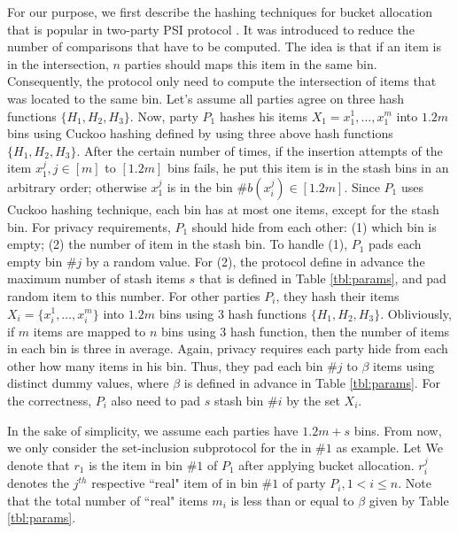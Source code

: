 For our purpose, we first describe the hashing techniques for bucket allocation that is popular in two-party PSI protocol \cite{eurocrypt:FNP04, DBLP:conf/uss/Pinkas0SZ15,DBLP:conf/uss/Pinkas0Z14}. It was introduced to reduce the number of comparisons that have to be computed. The idea is that if an item is in the intersection, $n$ parties should maps this item in the same bin. Consequently, the protocol only need to compute the intersection of items that was located to the same bin. Let's assume all parties agree on three hash functions $\{H_1, H_2, H_3\}$. Now, party $P_1$ hashes his items $X_1={x^1_1, \ldots, x^m_1}$ into $1.2m$ bins using Cuckoo hashing defined by using three above hash functions $\{H_1, H_2, H_3\}$. After the certain number of times, if the insertion attempts of the item $x^j_1, j \in [m]$ to $[1.2m]$ bins  fails,  he put this item is in the stash bins in an arbitrary order; otherwise $x^j_1$ is in the bin \#$b(x^j_i) \in [1.2m]$. Since $P_1$ uses Cuckoo hashing technique, each bin has at most one items, except for the stash bin. For privacy requirements, $P_1$ should hide from each other: (1) which bin is empty; (2) the number of item in the stash bin. To handle (1), $P_1$ pads each empty bin \#$j$ by a random value. For (2), the protocol define in advance the maximum number of stash items $s$ that is defined in Table \ref{tbl:params}, and pad random item to this number.  For other parties $P_i$, they hash their items $X_i=\{x^1_i, \ldots, x^m_i\}$ into $1.2m$ bins using 3 hash functions $\{H_1, H_2, H_3\}$. Obliviously, if $m$ items are mapped to $n$ bins using 3 hash function, then the number of items in each bin is three in average. Again, privacy requires each party hide from each other how many items in his bin. Thus, they pad each bin \#$j$ to $\beta$ items using distinct dummy values, where $\beta$ is defined in advance in Table \ref{tbl:params}. For the correctness, $P_i$ also need to pad $s$ stash bin \#$i$ by the set $X_i$. %




In the sake of simplicity, we assume each parties have $1.2m+s$ bins. From now, we only consider the set-inclusion subprotocol for the in \#$1$ as example. Let  We denote that $r_1$ is the item in bin \#$1$ of $P_1$ after applying bucket allocation. $r^{j}_i $ denotes the $j^{th}$ respective ``real" item of in bin \#$1$ of party $P_i, 1<i\leq n$. Note that the total number of ``real" items $m_i$ is less than or equal to $\beta$ given by Table \ref{tbl:params}.

